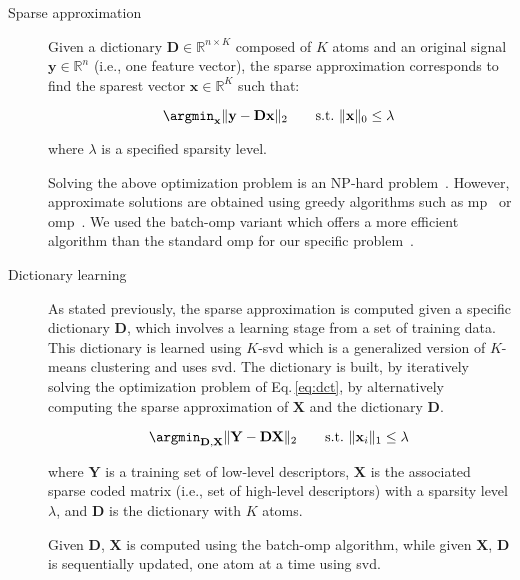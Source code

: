 \begin{description}
\item[Sparse approximation] Given a dictionary $\mathbf{D} \in \mathbb{R}^{n \times K}$ composed of $K$ atoms and an original signal $\mathbf{y} \in \mathbb{R}^{n}$ (i.e., one feature vector), the sparse approximation corresponds to find the sparest vector $\mathbf{x} \in \mathbb{R}^{K}$ such that:

\begin{equation}
  \argmin_{\mathbf{x}}\|\mathbf{y - Dx} \|_{2} \qquad  \text{s.t.} \  \|\mathbf{x}\|_{0} \leq \lambda \, \label{eq:sprapp}
\end{equation}

\noindent where $\lambda$ is a specified sparsity level.

Solving the above optimization problem is an NP-hard problem~\cite{elad2010sparse}.
However, approximate solutions are obtained using greedy algorithms such as \ac{mp}~\cite{mallat1993matching} or \ac{omp}~\cite{pati1993orthogonal,davis1997adaptive}.
We used the batch-\ac{omp} variant which offers a more efficient algorithm than the standard \ac{omp} for our specific problem~\cite{rubinstein2008efficient}.

\item[Dictionary learning] As stated previously, the sparse approximation is computed given a specific dictionary $\mathbf{D}$, which involves a learning stage from a set of training data.
This dictionary is learned using $K$-\acs*{svd} which is a generalized version of $K$-means clustering and uses \ac{svd}. 
The dictionary is built, by iteratively solving the optimization problem of Eq.\,\ref{eq:dct}, by alternatively computing the sparse approximation of $\mathbf{X}$ and the dictionary $\mathbf{D}$.

\begin{equation}
  \argmin_{\mathbf{D,X}} \|\mathbf{Y} - \mathbf{D}\mathbf{X}\|_{2} \qquad  \text{s.t.} \  \|\mathbf{x}_{i}\|_{1} \leq \lambda \,\label{eq:dct}
\end{equation}

\noindent where $\mathbf{Y}$ is a training set of low-level descriptors, $\mathbf{X}$ is the associated sparse coded matrix (i.e., set of high-level descriptors) with a sparsity level $\lambda$, and $\mathbf{D}$ is the dictionary with $K$ atoms.

Given $\mathbf{D}$, $\mathbf{X}$ is computed using the batch-\ac{omp} algorithm, while given $\mathbf{X}$, $\mathbf{D}$ is sequentially updated, one atom at a time using \ac{svd}. 


\end{description}

